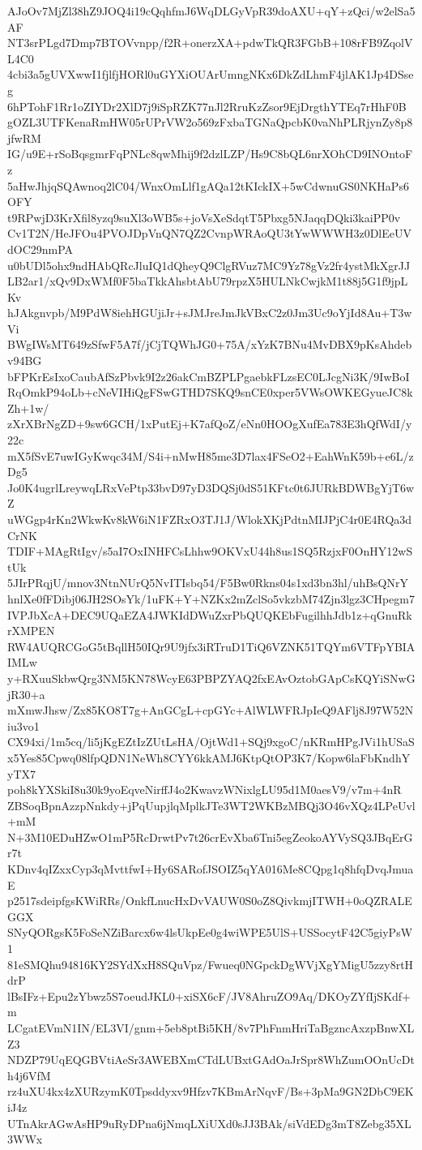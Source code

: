 AJoOv7MjZl38hZ9JOQ4i19cQqhfmJ6WqDLGyVpR39doAXU+qY+zQci/w2elSa5AF
NT3srPLgd7Dmp7BTOVvnpp/f2R+onerzXA+pdwTkQR3FGbB+108rFB9ZqolVL4C0
4cbi3a5gUVXwwI1fjlfjHORl0uGYXiOUArUmngNKx6DkZdLhmF4jlAK1Jp4DSseg
6hPTohF1Rr1oZIYDr2XlD7j9iSpRZK77nJl2RruKzZsor9EjDrgthYTEq7rHhF0B
gOZL3UTFKenaRmHW05rUPrVW2o569zFxbaTGNaQpcbK0vaNhPLRjynZy8p8jfwRM
IG/u9E+rSoBqsgmrFqPNLc8qwMhij9f2dzlLZP/Hs9C8bQL6nrXOhCD9INOntoFz
5aHwJhjqSQAwnoq2lC04/WnxOmLlf1gAQa12tKIckIX+5wCdwnuGS0NKHaPs6OFY
t9RPwjD3KrXfil8yzq9suXl3oWB5s+joVsXeSdqtT5Pbxg5NJaqqDQki3kaiPP0v
Cv1T2N/HeJFOu4PVOJDpVnQN7QZ2CvnpWRAoQU3tYwWWWH3z0DlEeUVdOC29nmPA
u0bUDl5ohx9ndHAbQRcJluIQ1dQheyQ9ClgRVuz7MC9Yz78gVz2fr4ystMkXgrJJ
LB2ar1/xQv9DxWMf0F5baTkkAhsbtAbU79rpzX5HULNkCwjkM1t88j5G1f9jpLKv
hJAkgnvpb/M9PdW8iehHGUjiJr+sJMJreJmJkVBxC2z0Jm3Uc9oYjId8Au+T3wVi
BWgIWsMT649zSfwF5A7f/jCjTQWhJG0+75A/xYzK7BNu4MvDBX9pKsAhdebv94BG
bFPKrEsIxoCaubAfSzPbvk9I2z26akCmBZPLPgaebkFLzsEC0LJcgNi3K/9IwBoI
RqOmkP94oLb+cNeVIHiQgFSwGTHD7SKQ9snCE0xper5VWsOWKEGyueJC8kZh+1w/
zXrXBrNgZD+9sw6GCH/1xPutEj+K7afQoZ/eNn0HOOgXufEa783E3hQfWdI/y22c
mX5fSvE7uwIGyKwqc34M/S4i+nMwH85me3D7lax4FSeO2+EahWnK59b+e6L/zDg5
Jo0K4ugrlLreywqLRxVePtp33bvD97yD3DQSj0dS51KFtc0t6JURkBDWBgYjT6wZ
uWGgp4rKn2WkwKv8kW6iN1FZRxO3TJ1J/WlokXKjPdtnMIJPjC4r0E4RQa3dCrNK
TDIF+MAgRtIgv/s5aI7OxINHFCsLhhw9OKVxU44h8us1SQ5RzjxF0OnHY12wStUk
5JIrPRqjU/mnov3NtnNUrQ5NvITIsbq54/F5Bw0Rkns04s1xd3bn3hl/uhBsQNrY
hnlXe0fFDibj06JH2SOsYk/1uFK+Y+NZKx2mZclSo5vkzbM74Zjn3lgz3CHpegm7
IVPJbXcA+DEC9UQaEZA4JWKIdDWuZxrPbQUQKEbFugilhhJdb1z+qGnuRkrXMPEN
RW4AUQRCGoG5tBqllH50IQr9U9jfx3iRTruD1TiQ6VZNK51TQYm6VTFpYBIAIMLw
y+RXuuSkbwQrg3NM5KN78WcyE63PBPZYAQ2fxEAvOztobGApCsKQYiSNwGjR30+a
mXmwJhsw/Zx85KO8T7g+AnGCgL+cpGYc+AlWLWFRJpIeQ9AFlj8J97W52Niu3vo1
CX94xi/1m5cq/li5jKgEZtIzZUtLsHA/OjtWd1+SQj9xgoC/nKRmHPgJVi1hUSaS
x5Yes85Cpwq08lfpQDN1NeWh8CYY6kkAMJ6KtpQtOP3K7/Kopw6laFbKndhYyTX7
poh8kYXSkiI8u30k9yoEqveNirffJ4o2KwavzWNixlgLU95d1M0aesV9/v7m+4nR
ZBSoqBpnAzzpNnkdy+jPqUupjlqMplkJTe3WT2WKBzMBQj3O46vXQz4LPeUvl+mM
N+3M10EDuHZwO1mP5RcDrwtPv7t26crEvXba6Tni5egZeokoAYVySQ3JBqErGr7t
KDnv4qIZxxCyp3qMvttfwI+Hy6SARofJSOIZ5qYA016Me8CQpg1q8hfqDvqJmuaE
p2517sdeipfgsKWiRRs/OnkfLnucHxDvVAUW0S0oZ8QivkmjITWH+0oQZRALEGGX
SNyQORgsK5FoSeNZiBarcx6w4lsUkpEe0g4wiWPE5UlS+USSocytF42C5giyPsW1
81eSMQhu94816KY2SYdXxH8SQuVpz/Fwueq0NGpckDgWVjXgYMigU5zzy8rtHdrP
lBsIFz+Epu2zYbwz5S7oeudJKL0+xiSX6cF/JV8AhruZO9Aq/DKOyZYfIjSKdf+m
LCgatEVmN1IN/EL3VI/gnm+5eb8ptBi5KH/8v7PhFnmHriTaBgzncAxzpBnwXLZ3
NDZP79UqEQGBVtiAeSr3AWEBXmCTdLUBxtGAdOaJrSpr8WhZumOOnUcDth4j6VfM
rz4uXU4kx4zXURzymK0Tpsddyxv9Hfzv7KBmArNqvF/Bs+3pMa9GN2DbC9EKiJ4z
UTnAkrAGwAsHP9uRyDPna6jNmqLXiUXd0sJJ3BAk/siVdEDg3mT8Zebg35XL3WWx
